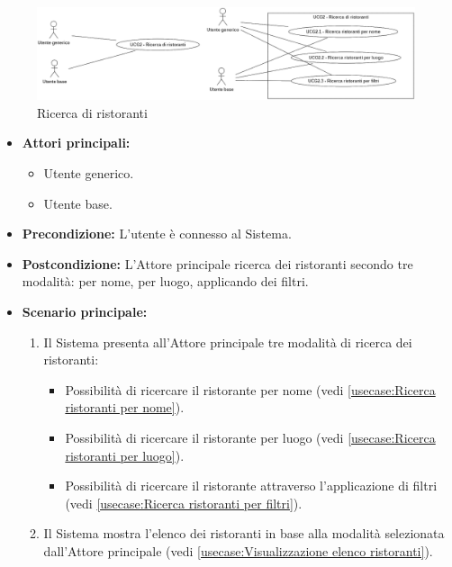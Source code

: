 \newpage
{}
\label{usecase:Ricerca di ristoranti}

\begin{figure}[h]
	\centering
	\includegraphics[width=0.99\textwidth]{./uml/UCG2.png} 
	\caption{Ricerca di ristoranti}
	\label{fig:UCG2}
\end{figure}

\begin{itemize}
	\item \textbf{Attori principali:} 
	\begin{itemize}
		\item Utente generico.
		\item Utente base.
	\end{itemize}

	\item \textbf{Precondizione:}
	      L'utente è connesso al Sistema.

	\item \textbf{Postcondizione:} L'Attore principale ricerca dei ristoranti secondo tre modalità: per nome, per luogo, applicando dei filtri.

	\item \textbf{Scenario principale:}
	      \begin{enumerate}
		      \item Il Sistema presenta all'Attore principale tre modalità di ricerca dei ristoranti:
		            \begin{itemize}
			            \item Possibilità di ricercare il ristorante per nome (vedi \autoref{usecase:Ricerca ristoranti per nome}).
			            \item Possibilità di ricercare il ristorante per luogo (vedi \autoref{usecase:Ricerca ristoranti per luogo}).
			            \item Possibilità di ricercare il ristorante attraverso l'applicazione di filtri (vedi \autoref{usecase:Ricerca ristoranti per filtri}).
		            \end{itemize}

		      \item Il Sistema mostra l'elenco dei ristoranti in base alla modalità selezionata dall'Attore principale (vedi \autoref{usecase:Visualizzazione elenco ristoranti}).

	      \end{enumerate}
\end{itemize}


